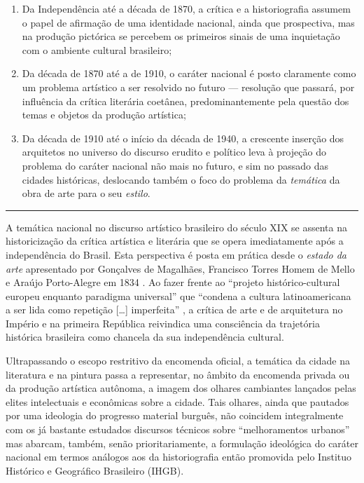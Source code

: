 \begin{enumerate}
\def\labelenumi{(\arabic{enumi})}
\tightlist
\item
  Da Independência até a década de 1870, a crítica e a historiografia
  assumem o papel de afirmação de uma identidade nacional, ainda que
  prospectiva, mas na produção pictórica se percebem os primeiros sinais
  de uma inquietação com o ambiente cultural brasileiro;
\item
  Da década de 1870 até a de 1910, o caráter nacional é posto claramente
  como um problema artístico a ser resolvido no futuro --- resolução que
  passará, por influência da crítica literária coetânea,
  predominantemente pela questão dos temas e objetos da produção
  artística;
\item
  Da década de 1910 até o início da década de 1940, a crescente inserção
  dos arquitetos no universo do discurso erudito e político leva à
  projeção do problema do caráter nacional não mais no futuro, e sim no
  passado das cidades históricas, deslocando também o foco do problema
  da \emph{temática} da obra de arte para o seu \emph{estilo}.
\end{enumerate}

\begin{center}\rule{0.5\linewidth}{0.5pt}\end{center}

A temática nacional no discurso artístico brasileiro do século XIX se
assenta na historicização da crítica artística e literária que se opera
imediatamente após a independência do Brasil. Esta perspectiva é posta
em prática desde o \emph{estado da arte} apresentado por Gonçalves de
Magalhães, Francisco Torres Homem de Mello e Araújo Porto-Alegre em 1834
\autocite{magalhaes:1834resume}. Ao fazer frente ao ``projeto
histórico-cultural europeu enquanto paradigma universal'' que ``condena
a cultura latinoamericana a ser lida como repetição {[}\ldots{]}
imperfeita'' \autocite[p.~360--361]{dallemand:1996urban15}, a crítica de
arte e de arquitetura no Império e na primeira República reivindica uma
consciência da trajetória histórica brasileira como chancela da sua
independência cultural.

Ultrapassando o escopo restritivo da encomenda oficial, a temática da
cidade na literatura e na pintura passa a representar, no âmbito da
encomenda privada ou da produção artística autônoma, a imagem dos
olhares cambiantes lançados pelas elites intelectuais e econômicas sobre
a cidade. Tais olhares, ainda que pautados por uma ideologia do
progresso material burguês, não coincidem integralmente com os já
bastante estudados discursos técnicos sobre ``melhoramentos urbanos''
\autocite{salgueiro:2001cidades} mas abarcam, também, senão
prioritariamente, a formulação ideológica do caráter nacional em termos
análogos aos da historiografia então promovida pelo Instituo Histórico e
Geográfico Brasileiro (IHGB).

